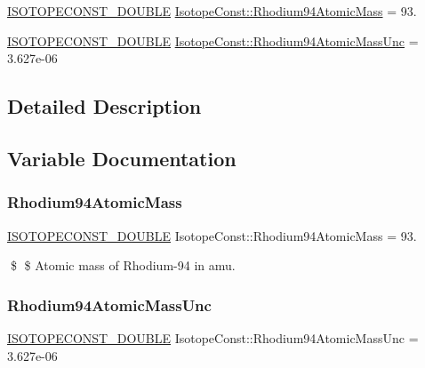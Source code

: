 \begin{DoxyCompactItemize}
\item 
\mbox{\hyperlink{group___isotope_const-_macros_ga8f45a7272ce02c0b4c65c44636ed719a}{I\+S\+O\+T\+O\+P\+E\+C\+O\+N\+S\+T\+\_\+\+D\+O\+U\+B\+LE}} \mbox{\hyperlink{group___isotope_const-_rhodium-_rh94_gacaaa4cd150b84c38938fec0e1c24ba69}{Isotope\+Const\+::\+Rhodium94\+Atomic\+Mass}} = 93.
\item 
\mbox{\hyperlink{group___isotope_const-_macros_ga8f45a7272ce02c0b4c65c44636ed719a}{I\+S\+O\+T\+O\+P\+E\+C\+O\+N\+S\+T\+\_\+\+D\+O\+U\+B\+LE}} \mbox{\hyperlink{group___isotope_const-_rhodium-_rh94_gac5d694bf419e4a5157757b3efcfae138}{Isotope\+Const\+::\+Rhodium94\+Atomic\+Mass\+Unc}} = 3.\+627e-\/06
\end{DoxyCompactItemize}


\subsection{Detailed Description}


\subsection{Variable Documentation}
\mbox{\label{group___isotope_const-_rhodium-_rh94_gacaaa4cd150b84c38938fec0e1c24ba69}} 
\subsubsection{\texorpdfstring{Rhodium94\+Atomic\+Mass}{Rhodium94AtomicMass}}
{\footnotesize\ttfamily \mbox{\hyperlink{group___isotope_const-_macros_ga8f45a7272ce02c0b4c65c44636ed719a}{I\+S\+O\+T\+O\+P\+E\+C\+O\+N\+S\+T\+\_\+\+D\+O\+U\+B\+LE}} Isotope\+Const\+::\+Rhodium94\+Atomic\+Mass = 93.}

\$ \$ Atomic mass of Rhodium-\/94 in amu. \mbox{\label{group___isotope_const-_rhodium-_rh94_gac5d694bf419e4a5157757b3efcfae138}} 
\subsubsection{\texorpdfstring{Rhodium94\+Atomic\+Mass\+Unc}{Rhodium94AtomicMassUnc}}
{\footnotesize\ttfamily \mbox{\hyperlink{group___isotope_const-_macros_ga8f45a7272ce02c0b4c65c44636ed719a}{I\+S\+O\+T\+O\+P\+E\+C\+O\+N\+S\+T\+\_\+\+D\+O\+U\+B\+LE}} Isotope\+Const\+::\+Rhodium94\+Atomic\+Mass\+Unc = 3.\+627e-\/06}

